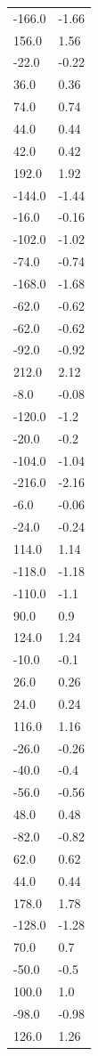 \begin{longtable}{ll}
-166.0 & -1.66 \\
156.0 & 1.56 \\
-22.0 & -0.22 \\
36.0 & 0.36 \\
74.0 & 0.74 \\
44.0 & 0.44 \\
42.0 & 0.42 \\
192.0 & 1.92 \\
-144.0 & -1.44 \\
-16.0 & -0.16 \\
-102.0 & -1.02 \\
-74.0 & -0.74 \\
-168.0 & -1.68 \\
-62.0 & -0.62 \\
-62.0 & -0.62 \\
-92.0 & -0.92 \\
212.0 & 2.12 \\
-8.0 & -0.08 \\
-120.0 & -1.2 \\
-20.0 & -0.2 \\
-104.0 & -1.04 \\
-216.0 & -2.16 \\
-6.0 & -0.06 \\
-24.0 & -0.24 \\
114.0 & 1.14 \\
-118.0 & -1.18 \\
-110.0 & -1.1 \\
90.0 & 0.9 \\
124.0 & 1.24 \\
-10.0 & -0.1 \\
26.0 & 0.26 \\
24.0 & 0.24 \\
116.0 & 1.16 \\
-26.0 & -0.26 \\
-40.0 & -0.4 \\
-56.0 & -0.56 \\
48.0 & 0.48 \\
-82.0 & -0.82 \\
62.0 & 0.62 \\
44.0 & 0.44 \\
178.0 & 1.78 \\
-128.0 & -1.28 \\
70.0 & 0.7 \\
-50.0 & -0.5 \\
100.0 & 1.0 \\
-98.0 & -0.98 \\
126.0 & 1.26 \\

\end{longtable}
